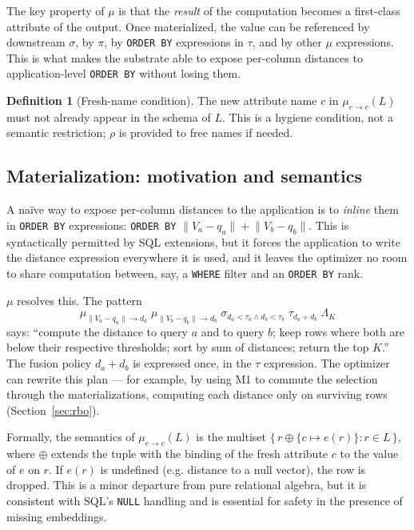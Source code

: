 \documentclass[sigconf,nonacm,review]{acmart}
\theoremstyle{plain}
\theoremstyle{definition}
\newtheorem{definition}{Definition}
\theoremstyle{remark}
\begin{document}
The key property of $\mu$ is that the \emph{result} of the computation
becomes a first-class attribute of the output. Once materialized, the
value can be referenced by downstream $\sigma$, by $\pi$, by
\texttt{ORDER BY} expressions in $\tau$, and by other $\mu$
expressions. This is what makes the substrate able to expose
per-column distances to application-level \texttt{ORDER BY} without losing them.

\begin{definition}[Fresh-name condition]\label{def:fresh}
The new attribute name $c$ in $\mu_{e\to c}(L)$ must not already
appear in the schema of $L$. This is a hygiene condition, not a
semantic restriction; $\rho$ is provided to free names if needed.
\end{definition}

\subsection{Materialization: motivation and semantics}

A na\"ive way to expose per-column distances to the application is
to \emph{inline} them in \texttt{ORDER BY} expressions:
\texttt{ORDER BY} $\lVert V_a - q_a \rVert + \lVert V_b - q_b \rVert$.
This is syntactically permitted by SQL extensions, but it forces the
application to write the distance expression everywhere it is used,
and it leaves the optimizer no room to share computation between,
say, a \texttt{WHERE} filter and an \texttt{ORDER BY} rank.

$\mu$ resolves this. The pattern
\[
\mu_{\lVert V_a-q_a\rVert\to d_a}\;
\mu_{\lVert V_b-q_b\rVert\to d_b}\;
\sigma_{d_a < \tau_a \wedge d_b < \tau_b}\;
\tau_{d_a + d_b}\;
\Lambda_K
\]
says: ``compute the distance to query $a$ and to query $b$; keep
rows where both are below their respective thresholds; sort by sum
of distances; return the top $K$.'' The fusion policy $d_a + d_b$ is
expressed once, in the $\tau$ expression. The optimizer can rewrite
this plan --- for example, by using M1 to commute the selection
through the materializations, computing each distance only on
surviving rows (Section~\ref{sec:rbo}).

Formally, the semantics of $\mu_{e\to c}(L)$ is the multiset
$\{\, r \oplus \{c \mapsto e(r)\} : r \in L \,\}$, where $\oplus$
extends the tuple with the binding of the fresh attribute $c$ to
the value of $e$ on $r$. If $e(r)$ is undefined (e.g. distance to a
null vector), the row is dropped. This is a minor departure from
pure relational algebra, but it is consistent with SQL's
\texttt{NULL} handling and is essential for safety in the presence of
missing embeddings.
\end{document}
